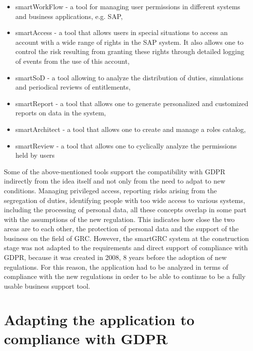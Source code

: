 \documentclass[en, noamssymb]{mgr}
\begin{document}
\begin{itemize}

\item smartWorkFlow - a tool for managing user permissions in different systems and business applications, e.g. SAP,

\item smartAccess - a tool that allows users in special situations to access an account with a wide range of rights in the SAP system. It also allows one to control the risk resulting from granting these rights through detailed logging of events from the use of this account,

\item smartSoD - a tool allowing to analyze the distribution of duties, simulations and periodical reviews of entitlements,

\item smartReport - a tool that allows one to generate personalized and customized reports on data in the system,

\item smartArchitect - a tool that allows one to create and manage a roles catalog,

\item smartReview - a tool that allows one to cyclically analyze the permissions held by users

\end{itemize}

Some of the above-mentioned tools support the compatibility with GDPR indirectly from the idea itself and not only from the need to adpat to new conditions. Managing privileged access, reporting risks arising from the segregation of duties, identifying people with too wide access to various systems, including the processing of personal data, all these concepts overlap in some part with the assumptions of the new regulation. This indicates how close the two areas are to each other, the protection of personal data and the support of the business on the field of GRC. However, the smartGRC system at the construction stage was not adapted to the requirements and direct support of compliance with GDPR, because it was created in 2008, 8 years before the adoption of new regulations. For this reason, the application had to be analyzed in terms of compliance with the new regulations in order to be able to continue to be a fully usable business support tool.

\section{Adapting the application to compliance with GDPR}
\end{document}
